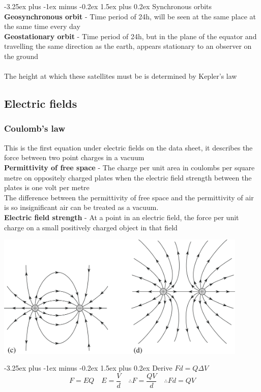 \documentclass[12pt]{article}
\makeatletter
\renewcommand{\paragraph}{\@startsection{paragraph}{4}{0ex}%
    {-3.25ex plus -1ex minus -0.2ex}%
    {1.5ex plus 0.2ex}%
    {\normalfont\normalsize\bfseries}}
\makeatother
\begin{document}
\paragraph{Synchronous orbits}
\textbf{Geosynchronous orbit} - Time period of 24h, will be seen at the same place at the same time every day\\ 
\textbf{Geostationary orbit} - Time period of 24h, but in the plane of the equator and travelling the same direction as the earth, appears stationary to an observer on the ground\\
\\
The height at which these satellites must be is determined by Kepler's law
\subsection{Electric fields}
\subsubsection{Coulomb's law}
This is the first equation under electric fields on the data sheet, it describes the force between two point charges in a vacuum\\
\textbf{Permittivity of free space} - The charge per unit area in coulombs per square metre on oppositely charged plates when the electric field strength between the plates is one volt per metre\\
The difference between the permittivity of free space and the permittivity of air is so insignificant air can be treated as a vacuum.\\
\textbf{Electric field strength} - At a point in an electric field, the force per unit charge on a small positively charged object in that field
\begin{center}
\includegraphics[width=12cm]{field_lines.png} 
\end{center}

\paragraph{Derive $Fd=Q\Delta V$}
$$F=EQ \quad E=\frac{V}{d} \quad\therefore F=\frac{QV}{d} \quad\therefore Fd=QV$$
\end{document}

